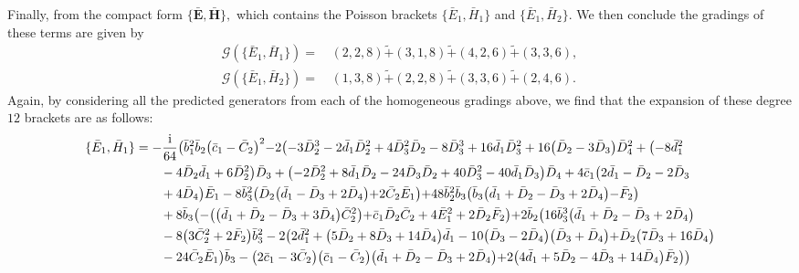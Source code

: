 \documentclass[10pt]{amsart}
\theoremstyle{definition}
\theoremstyle{corollary}
\theoremstyle{remark}
\theoremstyle{conclusion}
\begin{document}
 Finally, from the compact form $\{\bar{\textbf{E}},\bar{\textbf{H}}\},$ which contains the Poisson brackets $\{\bar{E}_1,\bar{H}_1\}$ and $\{\bar{E}_1,\bar{H}_2\}.$ We then conclude the gradings of these terms are given by \begin{align}
     \mathcal{G} \left(\{\bar{E}_1,\bar{H}_1\}\right) = &\, (2,2,8) \tilde{+}(3,1,8) \tilde{+}(4,2,6) \tilde{+}(3,3,6)  , \nonumber \\
      \mathcal{G} \left(\{\bar{E}_1,\bar{H}_2\}\right) = &\, (1,3,8) \tilde{+}(2,2,8) \tilde{+}(3,3,6) \tilde{+}(2,4,6)  .
 \end{align}   Again, by considering all the predicted generators from each of the homogeneous gradings above, we find that the expansion of these degree $12$ brackets are as follows: 
 \begin{align}
	\{\bar{E}_1, \bar{H}_1\}&=-\frac{\rm i}{64}  \bigl(\bar{b}_1^2 \bar{b}_2 \bigl(\bar{c}_1-\bar{C}_2\bigl)^2-2 \bigl(-3 \bar{D}_2^3-2 \bar{d}_1 \bar{D}_2^2+4 \bar{D}_3^2 \bar{D}_2-8 \bar{D}_3^3+16 \bar{d}_1 \bar{D}_3^2+16 \bigl(\bar{D}_2-3 \bar{D}_3\bigl) \bar{D}_4^2+\bigl(-8 \bar{d}_1^2 \nonumber\\
	& \hskip 0.7 cm-4 \bar{D}_2 \bar{d}_1+6 \bar{D}_2^2\bigl) \bar{D}_3+\bigl(-2 \bar{D}_2^2+8 \bar{d}_1 \bar{D}_2-24 \bar{D}_3 \bar{D}_2+40 \bar{D}_3^2-40 \bar{d}_1 \bar{D}_3\bigl) \bar{D}_4+4 \bar{c}_1 \bigl(2 \bar{d}_1-\bar{D}_2-2 \bar{D}_3 \nonumber\\
	& \hskip 0.7 cm+4 \bar{D}_4\bigl) \bar{E}_1-8 \bar{b}_3^2 \bigl(\bar{D}_2 \bigl(\bar{d}_1-\bar{D}_3+2 \bar{D}_4\bigl)+2 \bar{C}_2 \bar{E}_1\bigl)+48 \bar{b}_2^2 \bar{b}_3 \bigl(\bar{b}_3 \bigl(\bar{d}_1+\bar{D}_2-\bar{D}_3+2 \bar{D}_4\bigl)-\bar{F}_2\bigl) \nonumber\\
	& \hskip 0.7 cm+8 \bar{b}_3 \bigl(-\bigl(\bigl(\bar{d}_1+\bar{D}_2-\bar{D}_3+3 \bar{D}_4\bigl) \bar{C}_2^2\bigl)+\bar{c}_1 \bar{D}_2 \bar{C}_2+4 \bar{E}_1^2+2 \bar{D}_2 \bar{F}_2\bigl)+2 \bar{b}_2 \bigl(16\bar{b}_3^3 \bigl(\bar{d}_1+\bar{D}_2-\bar{D}_3+2 \bar{D}_4\bigl) \nonumber\\
	& \hskip 0.7 cm -8 \bigl(3 \bar{C}_2^2+2 \bar{F}_2\bigl) \bar{b}_3^2-2 \bigl(2 \bar{d}_1^2+\bigl(5 \bar{D}_2+8 \bar{D}_3+14 \bar{D}_4\bigl) \bar{d}_1-10 \bigl(\bar{D}_3-2 \bar{D}_4\bigl) \bigl(\bar{D}_3+\bar{D}_4\bigl)+\bar{D}_2 \bigl(7 \bar{D}_3+16 \bar{D}_4\bigl) \nonumber\\
	& \hskip 0.7 cm-24 \bar{C}_2 \bar{E}_1\bigl) \bar{b}_3-\bigl(2 \bar{c}_1-3 \bar{C}_2\bigl) \bigl(\bar{c}_1-\bar{C}_2\bigl) \bigl(\bar{d}_1+\bar{D}_2-\bar{D}_3+2 \bar{D}_4\bigl)+2 \bigl(4 \bar{d}_1+5 \bar{D}_2-4 \bar{D}_3+14 \bar{D}_4\bigl) \bar{F}_2\bigl)\bigl) \nonumber\\

\end{align}
\end{document}
